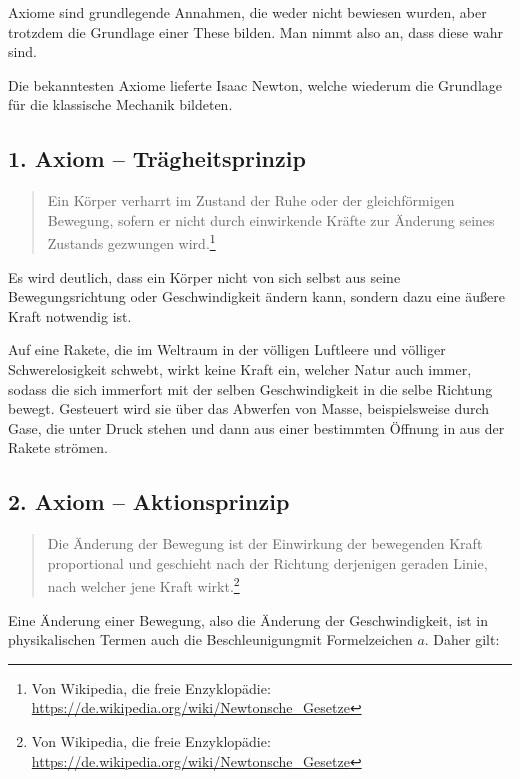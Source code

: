 Axiome sind grundlegende Annahmen, die weder nicht bewiesen wurden, aber trotzdem die Grundlage einer These bilden. Man nimmt also an, dass diese wahr sind.

Die bekanntesten Axiome lieferte Isaac Newton, welche wiederum die Grundlage für die klassische Mechanik bildeten.

\subsection{1. Axiom -- Trägheitsprinzip}

\begin{quote}
\glqq Ein Körper verharrt im Zustand der Ruhe oder der gleichförmigen Bewegung,%
sofern er nicht durch einwirkende Kräfte zur Änderung seines Zustands gezwungen wird.\grqq \footnote{Von Wikipedia, die freie Enzyklopädie: \url{https://de.wikipedia.org/wiki/Newtonsche_Gesetze}}
\end{quote}

\noindent Es wird deutlich, dass ein Körper nicht von sich selbst aus seine Bewegungsrichtung oder Geschwindigkeit ändern kann, sondern dazu eine äußere Kraft notwendig ist.

\begin{Beispiel}
	Auf eine Rakete, die im Weltraum in der völligen Luftleere und völliger Schwerelosigkeit schwebt, wirkt keine Kraft ein, welcher Natur auch immer, sodass die sich immerfort mit der selben Geschwindigkeit in die selbe Richtung bewegt. Gesteuert wird sie über das \glqq Abwerfen\grqq{} von Masse, beispielsweise durch Gase, die unter Druck stehen und dann aus einer bestimmten Öffnung in aus der Rakete strömen.
\end{Beispiel}


\subsection{2. Axiom -- Aktionsprinzip}

\begin{quote}
\glqq Die Änderung der Bewegung ist der Einwirkung der bewegenden Kraft proportional und geschieht nach der Richtung derjenigen geraden Linie, nach welcher jene Kraft wirkt.\grqq \footnote{Von Wikipedia, die freie Enzyklopädie: \url{https://de.wikipedia.org/wiki/Newtonsche_Gesetze}}
\end{quote}

\noindent Eine Änderung einer Bewegung, also die Änderung der Geschwindigkeit, ist in physikalischen Termen auch die \glqq Beschleunigung\grqq mit Formelzeichen $a$. Daher gilt:

